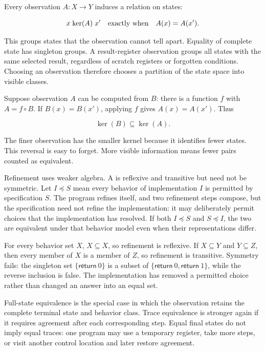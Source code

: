 Every observation \(A:X\rightarrow Y\) induces a relation on states:

\[
  x\mathrel{\ker(A)}x'
  \quad\hbox{exactly when}\quad
  A(x)=A(x').
\]

This  groups states that the observation cannot tell
apart. Equality of complete state has singleton groups. A result-register
observation groups all states with the same selected result, regardless of
scratch registers or forgotten conditions. Choosing an observation therefore
chooses a partition of the state space into visible classes.

Suppose observation \(A\) can be computed from \(B\): there is a function
\(f\) with \(A=f\circ B\). If \(B(x)=B(x')\), applying \(f\) gives
\(A(x)=A(x')\). Thus

\[
  \ker(B)\subseteq\ker(A).
\]

The finer observation has the smaller kernel because it identifies fewer
states. This reversal is easy to forget. More visible information means fewer
pairs counted as equivalent.

Refinement uses weaker algebra. A  is reflexive and
transitive but need not be symmetric. Let \(I\preceq S\) mean every behavior
of implementation \(I\) is permitted by specification \(S\). The program
refines itself, and two refinement steps compose, but the specification need
not refine the implementation: it may deliberately permit choices that the
implementation has resolved. If both \(I\preceq S\) and \(S\preceq I\), the
two are equivalent under that behavior model even when their representations
differ.

\begin{proofkit}[title={Behavior inclusion is a refinement preorder}]
For every behavior set \(X\), \(X\subseteq X\), so refinement is reflexive. If
\(X\subseteq Y\) and \(Y\subseteq Z\), then every member of \(X\) is a member of
\(Z\), so refinement is transitive. Symmetry fails: the singleton set
\(\{\mathsf{return}\ 0\}\) is a subset of
\(\{\mathsf{return}\ 0,\mathsf{return}\ 1\}\), while the reverse inclusion is
false. The implementation has removed a permitted choice rather than changed
an answer into an equal set.
\end{proofkit}

Full-state equivalence is the special case in which the observation retains
the complete terminal state and behavior class. Trace equivalence is stronger
again if it requires agreement after each corresponding step. Equal final
states do not imply equal traces: one program may use a temporary register,
take more steps, or visit another control location and later restore agreement.

